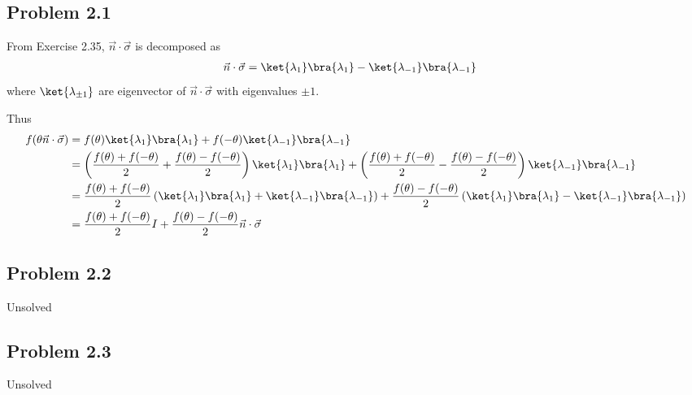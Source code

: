 \documentclass[a4paper,12pt]{article}
\begin{document}
\vspace{1cm}

\subsection*{Problem 2.1}

From Exercise 2.35, $\vec{n} \cdot \vec{\sigma}$ is decomposed as
\begin{align*}
	\vec{n} \cdot \vec{\sigma} &= \ket{\lambda_1}\bra{\lambda_1} - \ket{\lambda_{-1}}\bra{\lambda_{-1}}
\end{align*}
where $\ket{\lambda_{\pm 1}}$ are eigenvector of $\vec{n} \cdot \vec{\sigma}$ with eigenvalues $\pm 1$.

Thus
\begin{align*}
	f(\theta \vec{n} \cdot \vec{\sigma}) &= f(\theta) \ket{\lambda_1}\bra{\lambda_1} + f(- \theta) \ket{\lambda_{-1}}\bra{\lambda_{-1}}\\
		&= \left( \frac{f(\theta) + f(-\theta)}{2} + \frac{f(\theta) - f(-\theta)}{2}  \right) \ket{\lambda_1}\bra{\lambda_1} + \left( \frac{f(\theta) + f(-\theta)}{2} - \frac{f(\theta) - f(-\theta)}{2}  \right)\ket{\lambda_{-1}}\bra{\lambda_{-1}}\\
		&= \frac{f(\theta) + f(-\theta)}{2} \left( \ket{\lambda_1}\bra{\lambda_1} + \ket{\lambda_{-1}}\bra{\lambda_{-1}} \right) +  \frac{f(\theta) - f(-\theta)}{2} \left(\ket{\lambda_1}\bra{\lambda_1} - \ket{\lambda_{-1}}\bra{\lambda_{-1}} \right)\\
		&= \frac{f(\theta) + f(-\theta)}{2} I + \frac{f(\theta) - f(-\theta)}{2} \vec{n} \cdot \vec{\sigma}
\end{align*}

\vspace{1cm}

\subsection*{Problem 2.2}
Unsolved


\vspace{1cm}

\subsection*{Problem 2.3}
Unsolved
\end{document}
